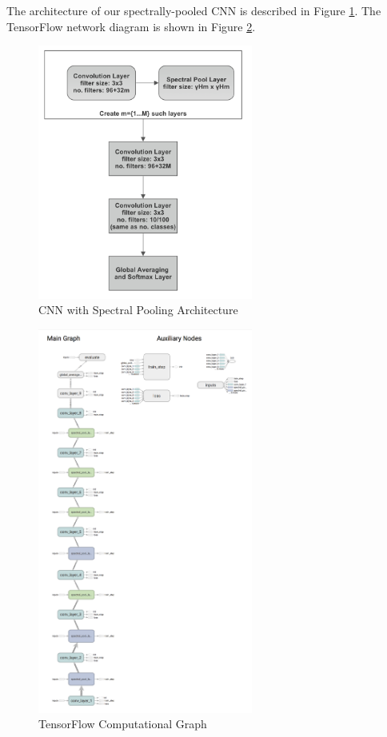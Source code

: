 \documentclass[10pt,journal,compsoc]{IEEEtran}
\begin{document}
The architecture of our spectrally-pooled CNN is described in Figure \ref{fig:cnn_arch}. The TensorFlow network diagram is shown in Figure \ref{fig:tb_graph}.

\begin{figure}[ht]
\centering
  \includegraphics[width=200pt]{images/fc_cnn_arch.png}
  \caption{CNN with Spectral Pooling Architecture}
  \label{fig:cnn_arch}
\end{figure}

\begin{figure}[h]
\centering
  \includegraphics[width=200pt]{images/Architecture_10.png}
  \caption{TensorFlow Computational Graph}
  \label{fig:tb_graph}
\end{figure}
\end{document}

